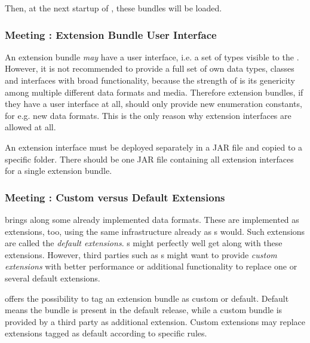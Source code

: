 Then, at the next startup of \LibName{}, these bundles will be loaded.


\subsubsection{Meeting \REQUextExtensionInterface{}: Extension Bundle User Interface}
\label{sec:ExtensionBundleInterface}

An extension bundle \emph{may} have a user interface, i.e. a set of types visible to the \LibName{} \ACTORuser{}. However, it is not recommended to provide a full set of own data types, classes and interfaces with broad functionality, because the strength of \LibName{} is its genericity among multiple different data formats and media. Therefore extension bundles, if they have a user interface at all, should only provide new enumeration constants, for e.g. new data formats. This is the only reason why extension interfaces are allowed at all.

An extension interface must be deployed separately in a JAR file and copied to a specific \LibName{} folder. There should be one JAR file containing all extension interfaces for a single extension bundle.


\subsubsection{Meeting \REQUextOverwriteDefaultExtensions{}: Custom versus Default Extensions}
\label{sec:CustomVersusDefaultExtensions}

\LibName{} brings along some already implemented data formats. These are implemented as extensions, too, using the same infrastructure already as \ACTORextender{}s would. Such extensions are called the \LibName{} \emph{default extensions}. \ACTORuser{}s might perfectly well get along with these extensions. However, third parties such as \ACTORextender{}s might want to provide \emph{custom extensions} with better performance or additional functionality to replace one or several default extensions.

\COMPextensionManagement{} offers the possibility to tag an extension bundle as custom or default. Default means the bundle is present in the default \LibName{} release, while a custom bundle is provided by a third party as additional extension. Custom extensions may replace extensions tagged as default according to specific rules.

